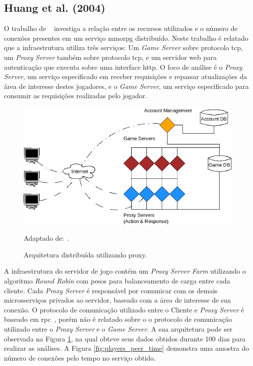 \subsection{Huang et al. (2004)}
\label{sec:huang}



O trabalho de ~\cite{1417630} investiga a relação entre os recursos utilizados e o número de conexões presentes em um serviço \ac{mmorpg} distribuído.
%
Neste trabalho é relatado que a infraestrutura utiliza três serviços: Um \textit{Game Server} sobre protocolo \ac{tcp}, um \textit{Proxy Server} também sobre protocolo \ac{tcp}, e um servidor web para autenticação que executa sobre uma interface \ac{http}.
%
O foco de análise é o \textit{Proxy Server}, um serviço especificado em receber requisições e repassar atualizações da área de interesse destes jogadores, e o \textit{Game Server}, um serviço especificado para consumir as requisições realizadas pelo jogador.



\begin{figure}[htb!]
\caption{Arquitetura distribuída utilizando proxy.}
\label{fig:game_with_proxy}
\includegraphics[width=\textwidth]{img/cap2/game_with_proxy.png}
\centering

Adaptado de:~\cite{1417630}.
\end{figure}



A infraestrutura do servidor de jogo contém um \textit{Proxy Server Farm} utilizando o algoritmo \textit{Round Robin} com pesos para balanceamento de carga entre cada cliente.
%
Cada \textit{Proxy Server} é responsável por comunicar com os demais microsserviços privados ao servidor, baseado com a área de interesse de sua conexão.
%
O protocolo de comunicação utilizado entre o Cliente e \textit{Proxy Server} é baseado em \ac{rpc}~\cite{faber, borella}, porém não é relatado sobre o o protocolo de comunicação utilizado entre o \textit{Proxy Server} e o \textit{Game Server}.
%
A sua arquitetura pode ser observada na Figura \ref{fig:game_with_proxy}, na qual obteve seus dados obtidos durante 100 dias para realizar as análises.
%
A Figura \ref{fig:players_peer_time} demonstra uma amostra do número de conexões pelo tempo no serviço obtido.



